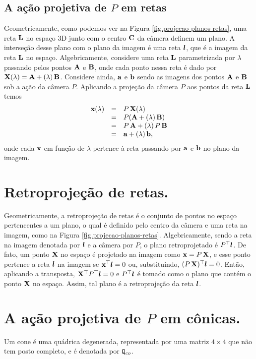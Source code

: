 \subsection{A ação projetiva de $P$ em retas}\label{sec.proj.retas}
Geometricamente, como podemos ver na Figura \ref{fig.projecao-planos-retas}, uma reta ${\bf L}$ no espaço 3D junto com o centro ${\bf C}$ da câmera definem um plano. A interseção desse plano com o plano da imagem é uma reta $\boldsymbol{l}$, que é a imagem da reta ${\bf L}$ no espaço. Algebricamente, considere uma reta ${\bf L}$ parametrizada por $\lambda$ passando pelos pontos ${\bf A}$ e ${\bf B}$, onde cada ponto nessa reta é dado por $\mathbf{X}(\lambda)={\bf A}+(\lambda)\,{\bf B}$. Considere ainda, ${\bf a}$ e ${\bf b}$ sendo as imagens dos pontos ${\bf A}$ e ${\bf B}$ sob a ação da câmera $P$. Aplicando a projeção da câmera $P$ aos pontos da reta ${\bf L}$ temos
\begin{equation*}
\begin{array}{rcl}
\mathbf{x}(\lambda)&=&P\,\mathbf{X}(\lambda)\\
&=&P({\bf A}+(\lambda)\,{\bf B})\\
&=&P\,{\bf A}+(\lambda)\,P\,{\bf B}\\
&=&{\bf a}+(\lambda)\,{\bf b},
\end{array}
\end{equation*}
onde cada $\mathbf{x}$ em função de $\lambda$ pertence à reta passando por ${\bf a}$ e ${\bf b}$ no plano da imagem.  
\section*{Retroprojeção de retas.}
Geometricamente, a retroprojeção de retas é o conjunto de pontos no espaço pertencentes a um plano, o qual é definido pelo centro da câmera e uma reta na imagem, como na Figura \ref{fig.projecao-planos-retas}. Algebricamente, sendo a reta na imagem denotada por $\boldsymbol{l}$ e a câmera por $P$, o plano retroprojetado é $P^\top\boldsymbol{l}$. De fato, um ponto $\mathbf{X}$ no espaço é projetado na imagem como $\mathbf{x}=P\,\mathbf{X}$, e esse ponto pertence a reta $\boldsymbol{l}$ na imagem se $\mathbf{x}^\top\boldsymbol{l}=0$ ou, substituindo, $(P\,\mathbf{X})^\top\boldsymbol{l}=0$. Então, aplicando a transposta, $\mathbf{X}^\top P^\top\boldsymbol{l}=0$ e $P^\top\boldsymbol{l}$ é tomado como o plano que contém o ponto $\mathbf{X}$ no espaço. Assim, tal plano é a retroprojeção da reta $\boldsymbol{l}$.  
\section*{A ação projetiva de $P$ em cônicas.}
Um cone é uma quádrica degenerada, representada por uma matriz $4\times4$ que não tem posto completo, e é denotada por ${\tt Q}_{co}$.

